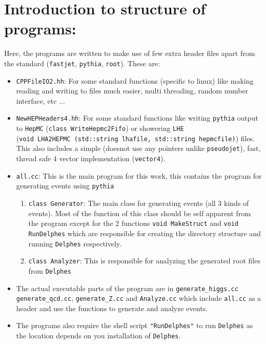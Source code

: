 \section{Introduction to structure of programs:}

Here, the programs are written to make use of few extra header files apart from the standard ({\tt fastjet}, {\tt pythia}, {\tt root}). These are:
\begin{itemize}
	\item {\tt CPPFileIO2.hh}: For some standard functions (specific to linux) like making reading and writing to files much easier, multi threading, random number interface, etc $\dots$
	
	\item {\tt NewHEPHeaders4.hh}: For some standard functions like writing {\tt pythia} output to {\tt HepMC} ({\tt class WriteHepmc2Fifo}) or showering {\tt LHE}\\ ({\tt void LHA2HEPMC (std::string lhafile, std::string hepmcfile)}) files. This also includes a simple (doesnot use any pointers unlike {\tt pseudojet}), fast, thread safe 4 vector implementation ({\tt vector4}).
	
	\item {\tt all.cc}: This is the main program for this work, this contains the program for generating events using {\tt pythia}
	\begin{enumerate}
		\item {\tt class Generator}: The main class for generating events (all 3 kinds of events). Most of the function of this class should be self apparent from the program except for the 2 functions {\tt void MakeStruct} and {\tt void RunDelphes} which are responsible for creating the directory structure and running {\tt Delphes} respectively.
		
		\item {\tt class Analyzer}: This is responsible for analyzing the generated root files from {\tt Delphes}
	\end{enumerate}

	\item The actual executable parts of the program are in
	{\tt generate\_higgs.cc} {\tt generate\_qcd.cc}, {\tt generate\_Z.cc} and {\tt Analyze.cc} which include {\tt all.cc} as a header and use the functions to generate and analyze events.
	
	\item The programs also require the shell script {\tt "RunDelphes"} to run {\tt Delphes} as the location depends on you installation of {\tt Delphes}.
	
\end{itemize}

